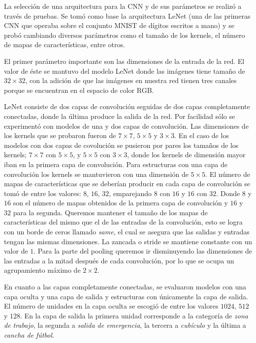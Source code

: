 La selección de una arquitectura para la CNN y de sus parámetros se
realizó a través de pruebas. Se tomó como base 
la arquitectura LeNet (una de las primeras CNN que operaba sobre el 
conjunto MNIST de dígitos escritos a mano) y se probó cambiando
diversos parámetros como el tamaño de los kernels, el número de
mapas de características, entre otros.

El primer parámetro importante son las dimensiones de
la entrada de la red. El valor de éste se mantuvo del
modelo LeNet donde las imágenes tiene tamaño de $32 \times 32$,
con la adición de que las imágenes en nuestra red
tienen tres canales porque se encuentran en el espacio de 
color RGB.

LeNet consiste de dos capas de convolución seguidas de dos
capas completamente conectadas, donde la última produce
la salida de la red.
Por facilidad sólo se experimentó con modelos de una y dos capas
de convolución. Las dimensiones de los kernels  que se probaron fueron de 
$7 \times 7$,
$5 \times 5$ y $3 \times 3$. En el caso de los modelos con
dos capas de covolución se pusieron por pares los tamaños de
los kernels; $7 \times 7$ con
$5 \times 5$, y $5 \times 5$ con $3 \times 3$, donde los kernels
de dimensión mayor iban en la primera capa de convolución.
Para estructuras con una capa de convolución los kernels
se mantuvieron con una dimensión de $5 \times 5$.
El número de mapas de características que se deberían producir
en cada capa de convolución se tomó de entre los valores: $8$, 
$16$, $32$, emparejando $8$ con $16$ y $16$ con $32$.
Donde $8$ y $16$ son el número de mapas obtenidos de la primera 
capa de convolución y $16$ y $32$ para la segunda.
Queremos mantener el tamaño de los mapas de
características del mismo que el de las entradas de la convolución,
esto se logra con un borde de ceros llamado \textit{same}, 
el cual se asegura que las salidas y entradas tengan las mismas dimensiones. 
La zancada o stride se mantiene constante con un valor de $1$.
Para la parte del pooling queremos ir disminuyendo las 
dimensiones de las entradas a la mitad después de cada
convolución, por lo que se ocupa un agrupamiento máximo 
de $2 \times 2$.


En cuanto a las capas completamente conectadas, se evaluaron
modelos con una capa oculta y una capa de salida y estructuras
con únicamente la capa de salida. El número de unidades 
en la capa oculta se escogió de entre los valores $1024$,
$512$ y $128$. En la capa de salida la primera unidad corresponde a la
categoría de \textit{zona de trabajo}, la segunda a 
\textit{salida de emergencia}, la tercera a \textit{cubículo}
y la última a \textit{cancha de fútbol}.

